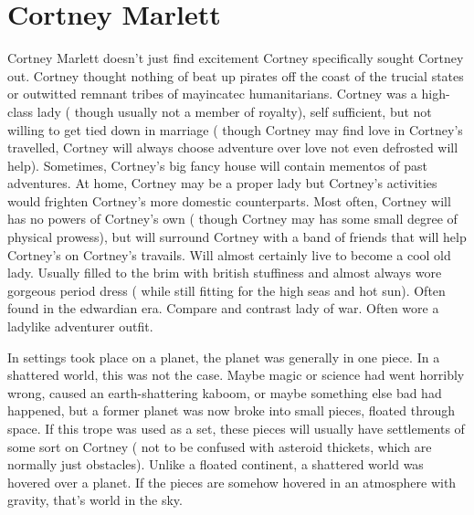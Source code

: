 \documentclass[12pt]{book}
\begin{document}
\chapter{Cortney Marlett}

Cortney Marlett doesn't just find excitement  Cortney specifically sought Cortney out. Cortney thought nothing of beat up pirates off the coast of the trucial states or outwitted remnant tribes of mayincatec humanitarians. Cortney was a high-class lady ( though usually not a member of royalty), self sufficient, but not willing to get tied down in marriage ( though Cortney may find love in Cortney's travelled, Cortney will always choose adventure over love  not even defrosted will help). Sometimes, Cortney's big fancy house will contain mementos of past adventures. At home, Cortney may be a proper lady but Cortney's activities would frighten Cortney's more domestic counterparts. Most often, Cortney will has no powers of Cortney's own ( though Cortney may has some small degree of physical prowess), but will surround Cortney with a band of friends that will help Cortney's on Cortney's travails. Will almost certainly live to become a cool old lady. Usually filled to the brim with british stuffiness and almost always wore gorgeous period dress ( while still fitting for the high seas and hot sun). Often found in the edwardian era. Compare and contrast lady of war. Often wore a ladylike adventurer outfit.



In settings took place on a planet, the planet was generally in one piece. In a shattered world, this was not the case. Maybe magic or science had went horribly wrong, caused an earth-shattering kaboom, or maybe something else bad had happened, but a former planet was now broke into small pieces, floated through space. If this trope was used as a set, these pieces will usually have settlements of some sort on Cortney ( not to be confused with asteroid thickets, which are normally just obstacles). Unlike a floated continent, a shattered world was hovered over a planet. If the pieces are somehow hovered in an atmosphere with gravity, that's world in the sky.
\end{document}
